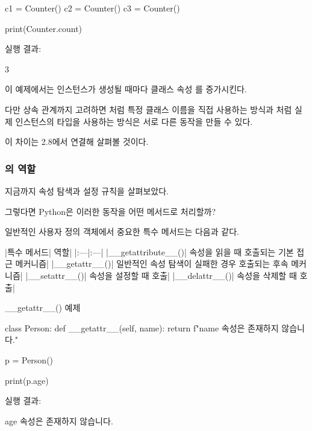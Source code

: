 \begin{dhkcode}
c1 = Counter()
c2 = Counter()
c3 = Counter()

print(Counter.count)
\end{dhkcode}

실행 결과:

\begin{dhkzsh}
3
\end{dhkzsh}

이 예제에서는 인스턴스가 생성될 때마다 클래스 속성 를 증가시킨다.

다만 상속 관계까지 고려하면 처럼 특정 클래스 이름을 직접 사용하는 방식과 처럼 실제 인스턴스의 타입을 사용하는 방식은 서로 다른 동작을 만들 수 있다.

이 차이는 2.8에서 연결해 살펴볼 것이다.

\subsubsection{의 역할}

지금까지 속성 탐색과 설정 규칙을 살펴보았다.

그렇다면 Python은 이러한 동작을 어떤 메서드로 처리할까?

일반적인 사용자 정의 객체에서 중요한 특수 메서드는 다음과 같다.

\begin{dhktable}
|특수 메서드|	역할|
|:---|:---|
|__getattribute__()|	속성을 읽을 때 호출되는 기본 접근 메커니즘|
|__getattr__()|	일반적인 속성 탐색이 실패한 경우 호출되는 후속 메커니즘|
|__setattr__()|	속성을 설정할 때 호출|
|__delattr__()|	속성을 삭제할 때 호출|
\end{dhktable}

\begin{dhknote}
\begin{dhksmry}[centered]
__getattr__() 예제
\end{dhksmry}
\end{dhknote}

\begin{dhkcode}
class Person:
    def __getattr__(self, name):
        return f"{name} 속성은 존재하지 않습니다."


p = Person()

print(p.age)
\end{dhkcode}

실행 결과:

\begin{dhkzsh}
age 속성은 존재하지 않습니다.
\end{dhkzsh}

